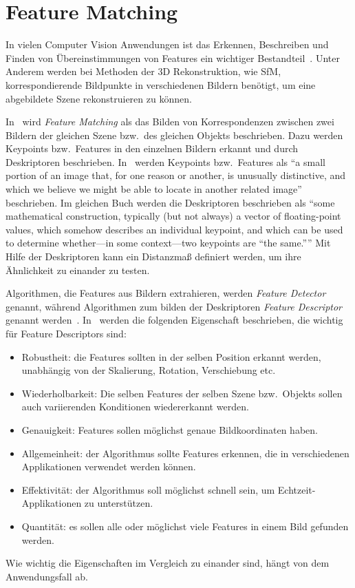 \section{Feature Matching}\label{sec:theory-feature-matching}
In vielen Computer Vision Anwendungen ist das Erkennen, Beschreiben und Finden von Übereinstimmungen von Features ein wichtiger Bestandteil~\cite{hassaballah_2016}.
Unter Anderem werden bei Methoden der 3D Rekonstruktion, wie SfM, korrespondierende Bildpunkte in verschiedenen Bildern benötigt, um eine abgebildete Szene rekonstruieren zu können.

In~\cite{hassaballah_2016} wird \emph{Feature Matching} als das Bilden von Korrespondenzen zwischen zwei Bildern der gleichen Szene bzw.\ des gleichen Objekts beschrieben.
Dazu werden Keypoints bzw.\ Features in den einzelnen Bildern erkannt und durch Deskriptoren beschrieben.
In~\cite[Kapitel 16]{kaehler_2016} werden Keypoints bzw.\ Features als \enquote{a small portion of an image that, for one reason or another, is unusually distinctive, and which we believe we might be
able to locate in another related image} beschrieben.
Im gleichen Buch werden die Deskriptoren beschrieben als \enquote{some mathematical construction, typically (but not always) a vector of floating-point values, which somehow describes an individual keypoint, and which can be used to determine whether---in some context---two keypoints are ``the same.''}
Mit Hilfe der Deskriptoren kann ein Distanzmaß definiert werden, um ihre Ähnlichkeit zu einander zu testen.

Algorithmen, die Features aus Bildern extrahieren, werden \emph{Feature Detector} genannt, während Algorithmen zum bilden der Deskriptoren \emph{Feature Descriptor} genannt werden~\cite{hassaballah_2016}.
In~\cite{hassaballah_2016} werden die folgenden Eigenschaft beschrieben, die wichtig für Feature Descriptors sind:
\begin{itemize}
    \item Robustheit: die Features sollten in der selben Position erkannt werden, unabhängig von der Skalierung, Rotation, Verschiebung etc.
    \item Wiederholbarkeit: Die selben Features der selben Szene bzw.\ Objekts sollen auch variierenden Konditionen wiedererkannt werden.
    \item Genauigkeit: Features sollen möglichst genaue Bildkoordinaten haben.
    \item Allgemeinheit: der Algorithmus sollte Features erkennen, die in verschiedenen Applikationen verwendet werden können.
    \item Effektivität: der Algorithmus soll möglichst schnell sein, um Echtzeit-Applikationen zu unterstützen. 
    \item Quantität: es sollen alle oder möglichst viele Features in einem Bild gefunden werden.
\end{itemize}
Wie wichtig die Eigenschaften im Vergleich zu einander sind, hängt von dem Anwendungsfall ab.



